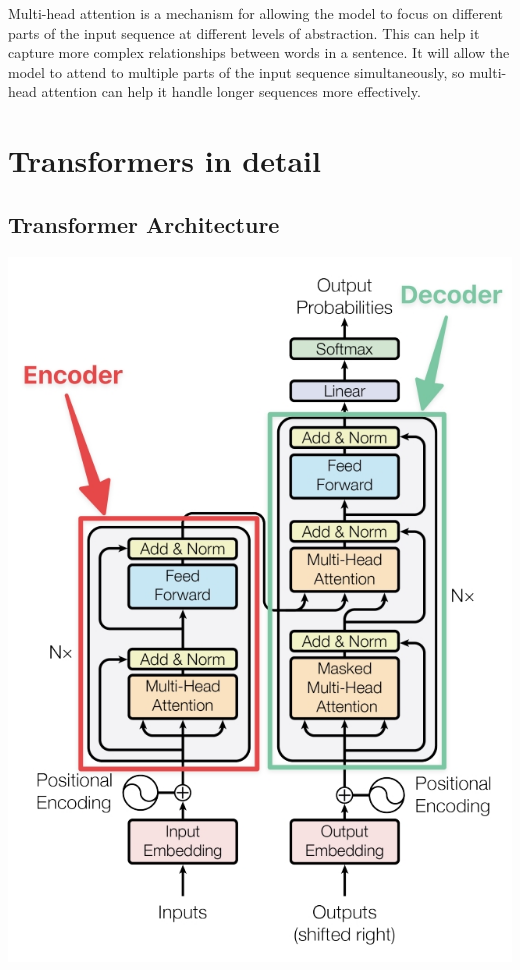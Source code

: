 Multi-head attention is a mechanism for allowing the model to focus on different parts of the input sequence at different levels of abstraction. This can help it capture more complex relationships between words in a sentence. It will allow the model to attend to multiple parts of the input sequence simultaneously, so multi-head attention can help it handle longer sequences more effectively.

\section{Transformers in detail}

\subsection{Transformer Architecture}
\includegraphics[width=1\linewidth]{img//rnn//transformers/transformer_architecture.jpeg}

